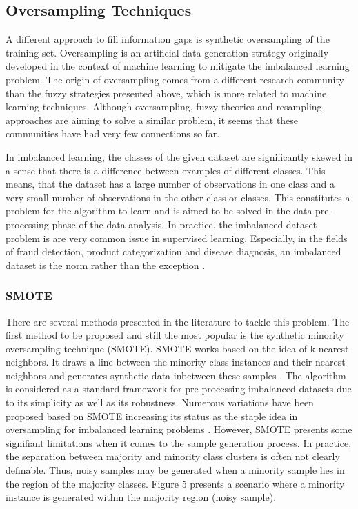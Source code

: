\documentclass[parskip=full]{scrartcl}
\begin{document}
\subsection{Oversampling Techniques}

A different approach to fill information gaps is synthetic oversampling of the
training set. Oversampling is an artificial data generation strategy originally
developed in the context of machine learning to mitigate the imbalanced 
learning problem. The origin of oversampling comes from a different research 
community than the fuzzy strategies presented above, which is more related to 
machine learning techniques. Although oversampling, fuzzy theories and 
resampling approaches are aiming to solve a similar problem, it seems that 
these communities have had very few connections so far. 

In imbalanced learning, the classes of the given dataset are significantly 
skewed in a sense that there is a difference between examples of different 
classes. This means, that the dataset has a large number of observations in one 
class and a very small number of observations in the other class or classes. 
This constitutes a problem for the algorithm to learn and is aimed to be solved 
in the data pre-processing phase of the data analysis. In practice, the 
imbalanced dataset problem is are very common issue in supervised learning. 
Especially, in the fields of fraud detection, product categorization and 
disease diagnosis, an imbalanced dataset is the norm rather than the exception 
\cite{He.2013}. 

\subsubsection{SMOTE}

There are several methods presented in the literature to tackle this problem.
The first method to be proposed and still the most popular is the synthetic 
minority oversampling technique (SMOTE). SMOTE works based on the idea of 
k-nearest neighbors. It draws a line between the minority class instances and 
their nearest neighbors and generates synthetic data inbetween these samples 
\cite{Chawla.2002}. The algorithm is considered as a standard framework for 
pre-processing imbalanced datasets due to its simplicity as well as its 
robustness. Numerous variations have been proposed based on SMOTE increasing 
its status as the staple idea in oversampling for imbalanced learning problems 
\cite{Fernandez.2018}. However, SMOTE presents some signifiant limitations when 
it comes to the sample generation process. In practice, the separation between 
majority and minority class clusters is often not clearly definable. Thus, 
noisy samples may be generated when a minority sample lies in the region of the 
majority classes. Figure 5 presents a scenario where a minority instance is 
generated within the majority region (noisy sample).
\end{document}
